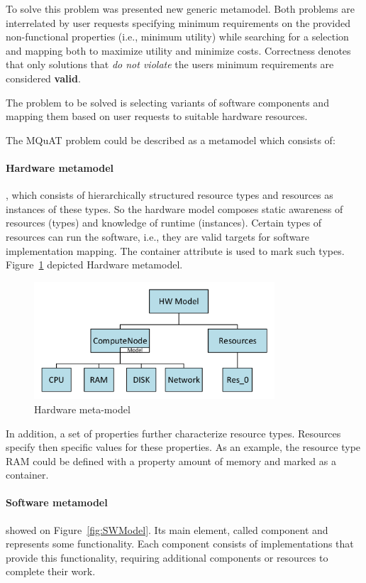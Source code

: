 To solve this problem was presented new generic metamodel. Both problems are interrelated by user requests specifying minimum requirements on the provided non-functional properties (i.e., minimum utility) while searching for a selection and mapping both to maximize utility and minimize costs. Correctness denotes that only solutions that \textit{do not violate} the users minimum requirements are considered \textbf{valid}.

The problem to be solved is selecting variants of software components and mapping them based on user requests to suitable hardware resources.

The MQuAT problem could be described as a metamodel which consists of:
\paragraph{Hardware metamodel}, which consists of hierarchically structured resource types and resources as instances of these types. So the hardware model composes static awareness of resources (types) and knowledge of runtime (instances). Certain types of resources can run the software, i.e., they are valid targets for software implementation mapping. The container attribute is used to mark such types. Figure~\ref{fig:HWmodel} depicted Hardware metamodel.

\begin{figure}
	\centering
	\includegraphics[width=0.8\textwidth]{images/HWModel.pdf}
	\caption[Hardware meta-model]{Hardware meta-model}
	\label{fig:HWmodel}
\end{figure}


In addition, a set of properties further characterize resource types. Resources specify then specific values for these properties. As an example, the resource type RAM could be defined with a property amount of memory and marked as a container.

\paragraph{Software metamodel} showed on Figure~\ref{fig:SWModel}. Its main element, called component and represents some functionality.
Each component consists of implementations that provide this functionality, requiring additional components or resources to complete their work. 

